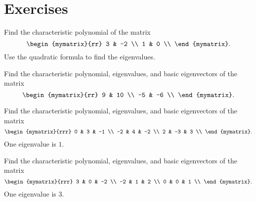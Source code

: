 \section*{Exercises}


\begin{ex}
  Find the characteristic polynomial of the matrix
  \begin{equation*}
    \begin{mymatrix}{rr}
      3 &  -2 \\
      1 &   0 \\
    \end{mymatrix}.
  \end{equation*}
  Use the quadratic formula to find the eigenvalues.
\end{ex}

\begin{ex}
  Find the characteristic polynomial, eigenvalues, and basic
  eigenvectors of the matrix
  \begin{equation*}
    \begin{mymatrix}{rr}
      9 &  10 \\
      -5 &  -6 \\
    \end{mymatrix}.
  \end{equation*}
\end{ex}

\begin{ex}
  Find the characteristic polynomial, eigenvalues, and basic
  eigenvectors of the matrix
  \begin{equation*}
    \begin{mymatrix}{rrr}
      0 &   3 &  -1 \\
      -2 &   4 &  -2 \\
      2 &  -3 &   3 \\
    \end{mymatrix}.
  \end{equation*}
  One eigenvalue is $1$.
\end{ex}

\begin{ex}
  Find the characteristic polynomial, eigenvalues, and basic
  eigenvectors of the matrix
  \begin{equation*}
    \begin{mymatrix}{rrr}
      3 &   0 &  -2 \\
      -2 &   1 &   2 \\
      0 &   0 &   1 \\
    \end{mymatrix}.
  \end{equation*}
  One eigenvalue is $3$.
\end{ex}

